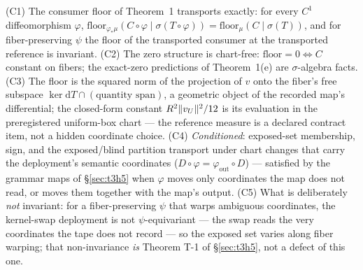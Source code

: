 
\begin{proposition}
\label{prop:t1-prongc}
(C1) The consumer floor of Theorem~1 transports exactly: for every $C^1$
diffeomorphism $\varphi$, $\mathrm{floor}_{\varphi_{*}\mu}(C \circ \varphi
\mid \sigma(T \circ \varphi)) = \mathrm{floor}_{\mu}(C \mid \sigma(T))$, and
for fiber-preserving $\psi$ the floor of the transported consumer at the
transported reference is invariant. (C2) The zero structure is chart-free:
$\mathrm{floor} = 0 \Leftrightarrow C$ constant on fibers; the exact-zero
predictions of Theorem~1(e) are $\sigma$-algebra facts. (C3) The floor is
the squared norm of the projection of $v$ onto the fiber's free subspace
$\ker \mathrm{d}T \cap (\text{quantity span})$, a geometric object of the
recorded map's differential; the closed-form constant $R^{2}\|v_{U}\|^{2}/12$
is its evaluation in the preregistered uniform-box chart --- the reference
measure is a declared contract item, not a hidden coordinate choice. (C4)
\emph{Conditioned}: exposed-set membership, sign, and the exposed/blind
partition transport under chart changes that carry the deployment's
semantic coordinates ($D \circ \varphi = \varphi_{\mathrm{out}} \circ D$) ---
satisfied by the grammar maps of \S\ref{sec:t3h5} when $\varphi$ moves only
coordinates the map does not read, or moves them together with the map's
output. (C5) What is deliberately \emph{not} invariant: for a
fiber-preserving $\psi$ that warps ambiguous coordinates, the kernel-swap
deployment is not $\psi$-equivariant --- the swap reads the very coordinates
the tape does not record --- so the exposed set varies along fiber warping;
that non-invariance \emph{is} Theorem T-1 of \S\ref{sec:t3h5}, not a defect
of this one.
\end{proposition}


